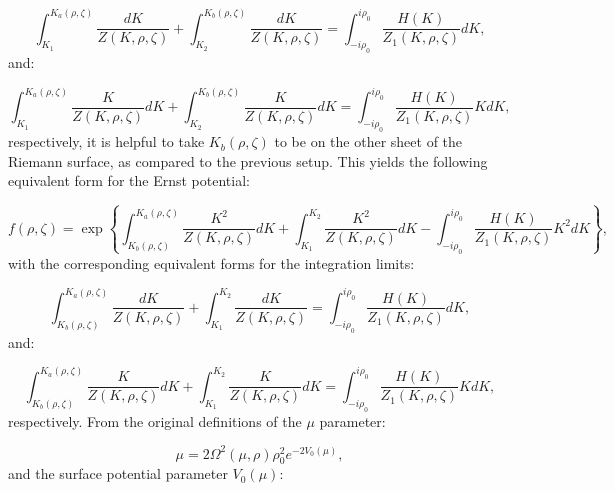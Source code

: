 \documentclass{article}
\begin{document}
\begin{equation}
\int_{K_1}^{K_a \left( \rho, \zeta \right)} \frac{d K}{Z \left( K, \rho, \zeta \right)} + \int_{K_2}^{K_b \left( \rho, \zeta \right)} \frac{d K}{Z \left( K, \rho, \zeta \right)} = \int_{- i \rho_0}^{i \rho_0} \frac{H \left( K \right)}{Z_1 \left( K, \rho, \zeta \right)} d K,
\end{equation}
and:

\begin{equation}
\int_{K_1}^{K_a \left( \rho, \zeta \right)} \frac{K}{Z \left( K, \rho, \zeta \right)} d K + \int_{K_2}^{K_b \left( \rho, \zeta \right)} \frac{K}{Z \left( K, \rho, \zeta \right)} d K = \int_{- i \rho_0}^{i \rho_0} \frac{H \left( K \right)}{Z_1 \left( K, \rho, \zeta \right)} K d K,
\end{equation}
respectively, it is helpful to take ${K_b \left( \rho, \zeta \right)}$ to be on the other sheet of the Riemann surface, as compared to the previous setup. This yields the following equivalent form for the Ernst potential:

\begin{equation}
f \left( \rho, \zeta \right) = \exp \left\lbrace \int_{K_b \left( \rho, \zeta \right)}^{K_a \left( \rho, \zeta \right)} \frac{K^2}{Z \left( K, \rho, \zeta \right)} d K + \int_{K_1}^{K_2} \frac{K^2}{Z \left( K, \rho, \zeta \right)} d K - \int_{-i \rho_0}^{i \rho_0} \frac{H \left( K \right)}{Z_1 \left( K, \rho, \zeta \right)} K^2 d K \right\rbrace,
\end{equation}
with the corresponding equivalent forms for the integration limits:

\begin{equation}
\int_{K_b \left( \rho, \zeta \right)}^{K_a \left( \rho, \zeta \right)} \frac{d K}{Z \left( K, \rho, \zeta \right)} + \int_{K_1}^{K_2} \frac{d K}{Z \left( K, \rho, \zeta \right)} = \int_{- i \rho_0}^{i \rho_0} \frac{H \left( K \right)}{Z_1 \left( K, \rho, \zeta \right)} d K,
\end{equation}
and:

\begin{equation}
\int_{K_b \left( \rho, \zeta \right)}^{K_a \left( \rho, \zeta \right)} \frac{K}{Z \left( K, \rho, \zeta \right)} d K + \int_{K_1}^{K_2} \frac{K}{Z \left( K, \rho, \zeta \right)} d K = \int_{- i \rho_0}^{i \rho_0} \frac{H \left( K \right)}{Z_1 \left( K, \rho, \zeta \right)} K d K,
\end{equation}
respectively. From the original definitions of the ${\mu}$ parameter:

\begin{equation}
\mu = 2 \Omega^2 \left( \mu, \rho \right) \rho_{0}^{2} e^{-2 V_0 \left( \mu \right)},
\end{equation}
and the surface potential parameter ${V_0 \left( \mu \right)}$:
\end{document}
